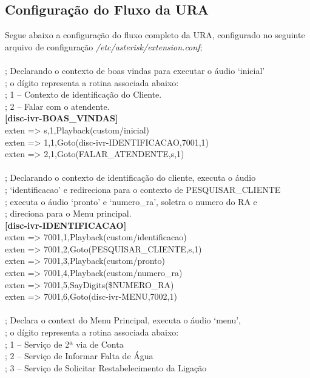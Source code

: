 \begin{anexosenv}
\chapter{Configuração do Fluxo da URA}
Segue abaixo a configuração do fluxo completo da URA, configurado no seguinte arquivo de configuração \textit{/etc/asterisk/extension.conf};
\\\\
; Declarando o contexto de boas vindas para executar o áudio ‘inicial’ \\
; o dígito representa a rotina associada abaixo: \\
; 1 – Contexto de identificação do Cliente. \\
; 2 – Falar com o atendente. \\
\textbf{[disc-ivr-BOAS\_VINDAS] }	 \\
exten => s,1,Playback(custom/inicial)  \\
exten => 1,1,Goto(disc-ivr-IDENTIFICACAO,7001,1)  \\
exten => 2,1,Goto(FALAR\_ATENDENTE,s,1)  \\
 \\
; Declarando o contexto de identificação do cliente, executa o áudio  \\
; ‘identificacao’ e redireciona para o contexto de PESQUISAR\_CLIENTE \\
; executa o áudio ‘pronto’ e ‘numero\_ra’, soletra o numero do RA e  \\
; direciona para o Menu principal. \\
\textbf{[disc-ivr-IDENTIFICACAO]} \\
exten => 7001,1,Playback(custom/identificacao) \\
exten => 7001,2,Goto(PESQUISAR\_CLIENTE,s,1) \\
exten => 7001,3,Playback(custom/pronto) \\
exten => 7001,4,Playback(custom/numero\_ra) \\
exten => 7001,5,SayDigits(\${NUMERO\_RA}) \\
exten => 7001,6,Goto(disc-ivr-MENU,7002,1) \\
 \\
; Declara o context do Menu Principal, executa o áudio ‘menu’, \\
; o dígito representa a rotina associada abaixo: \\
; 1 – Serviço de 2ª via de Conta \\
; 2 – Serviço de Informar Falta de Água \\
; 3 – Serviço de Solicitar Restabelecimento da Ligação \\

\end{anexosenv}
